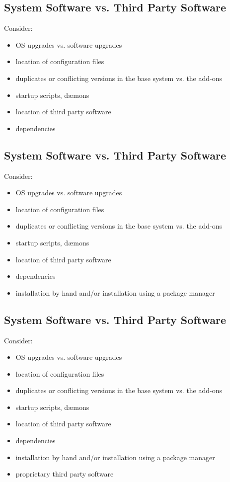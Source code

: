 \documentclass[xga]{xdvislides}
\begin{document}
\subsection{System Software vs. Third Party Software}
Consider:
\begin{itemize}
	\item OS upgrades vs. software upgrades
	\item location of configuration files
	\item duplicates or conflicting versions in the base system vs. the
		add-ons
	\item startup scripts, d{\ae}mons
	\item location of third party software
	\item dependencies
\end{itemize}

\subsection{System Software vs. Third Party Software}
Consider:
\begin{itemize}
	\item OS upgrades vs. software upgrades
	\item location of configuration files
	\item duplicates or conflicting versions in the base system vs. the
		add-ons
	\item startup scripts, d{\ae}mons
	\item location of third party software
	\item dependencies
	\item installation by hand and/or installation using a package manager
\end{itemize}


\subsection{System Software vs. Third Party Software}
Consider:
\begin{itemize}
	\item OS upgrades vs. software upgrades
	\item location of configuration files
	\item duplicates or conflicting versions in the base system vs. the
		add-ons
	\item startup scripts, d{\ae}mons
	\item location of third party software
	\item dependencies
	\item installation by hand and/or installation using a package manager
	\item proprietary third party software
\end{itemize}
\end{document}
